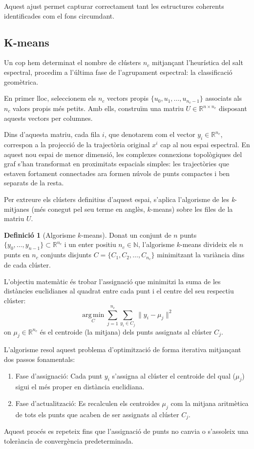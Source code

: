 \documentclass[12,twoside]{TFG-GM}
\theoremstyle{definition}
\newtheorem{definition}[theorem]{Definició}
\theoremstyle{remark}
\newcommand{\N}{\mathbb{N}}
\newcommand{\R}{\mathbb{R}}
\begin{document}
Aquest ajust permet capturar correctament tant les estructures coherents identificades com el fons circumdant.


\subsection{K-means}

Un cop hem determinat el nombre de clústers $n_c$ mitjançant l'heurística del salt espectral, procedim a l'última fase de l'agrupament espectral: la classificació geomètrica.

En primer lloc, seleccionem els $n_c$ vectors propis $\{u_0, u_1, \dots, u_{n_c-1}\}$ associats als $n_c$ valors propis més petits. Amb ells, construïm una matriu $U \in \R^{n \times n_c}$ disposant aquests vectors per columnes. 

Dins d'aquesta matriu, cada fila $i$, que denotarem com el vector $y_i \in \R^{n_c}$, correspon a la projecció de la trajectòria original $x^i$ cap al nou espai espectral. En aquest nou espai de menor dimensió, les complexes connexions topològiques del graf s'han transformat en proximitats espacials simples: les trajectòries que estaven fortament connectades ara formen núvols de punts compactes i ben separats de la resta.

Per extreure els clústers definitius d'aquest espai, s'aplica l'algorisme de les \textit{k}-mitjanes (més conegut pel seu terme en anglès, $k$-means) sobre les files de la matriu $U$.

\begin{definition}[Algorisme $k$-means]
    Donat un conjunt de $n$ punts $\{y_0, \dots, y_{n-1}\} \subset \R^{n_c}$ i un enter positiu $n_c\in\N$, l'algorisme $k$-means divideix els $n$ punts en $n_c$ conjunts disjunts $C = \{C_1, C_2, \dots, C_{n_c}\}$ minimitzant la variància dins de cada clúster. 
    
    L'objectiu matemàtic és trobar l'assignació que minimitzi la suma de les distàncies euclidianes al quadrat entre cada punt i el centre del seu respectiu clúster:
    \begin{equation}
        \operatorname*{arg\,min}_{C} \sum_{j=1}^{n_c} \sum_{y_i \in C_j} \|y_i - \mu_j\|^2
    \end{equation}
    on $\mu_j \in \R^{n_c}$ és el centroide (la mitjana) dels punts assignats al clúster $C_j$.
\end{definition}

L'algorisme resol aquest problema d'optimització de forma iterativa mitjançant dos passos fonamentals:
\begin{enumerate}
    \item Fase d'assignació: Cada punt $y_i$ s'assigna al clúster el centroide del qual ($\mu_j$) sigui el més proper en distància euclidiana.
    \item Fase d'actualització: Es recalculen els centroides $\mu_j$ com la mitjana aritmètica de tots els punts que acaben de ser assignats al clúster $C_j$.
\end{enumerate}
Aquest procés es repeteix fins que l'assignació de punts no canvia o s'assoleix una tolerància de convergència predeterminada. 
\end{document}
